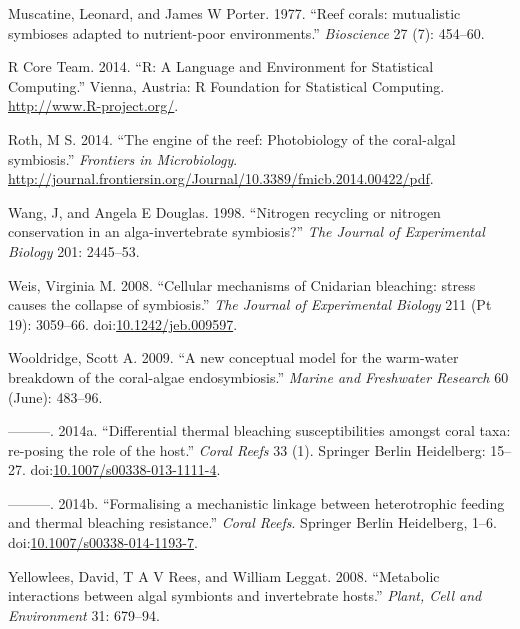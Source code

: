 \documentclass[]{elsarticle} %
\begin{document}
\hypertarget{ref-Muscatine:1977p4220}{}
Muscatine, Leonard, and James W Porter. 1977. ``Reef corals: mutualistic
symbioses adapted to nutrient-poor environments.'' \emph{Bioscience} 27
(7): 454--60.

\hypertarget{ref-RALanguageandEn:2014wf}{}
R Core Team. 2014. ``R: A Language and Environment for Statistical
Computing.'' Vienna, Austria: R Foundation for Statistical Computing.
\url{http://www.R-project.org/}.

\hypertarget{ref-Roth:2014wf}{}
Roth, M S. 2014. ``The engine of the reef: Photobiology of the
coral-algal symbiosis.'' \emph{Frontiers in Microbiology}.
\url{http://journal.frontiersin.org/Journal/10.3389/fmicb.2014.00422/pdf}.

\hypertarget{ref-Wang:1998p128}{}
Wang, J, and Angela E Douglas. 1998. ``Nitrogen recycling or nitrogen
conservation in an alga-invertebrate symbiosis?'' \emph{The Journal of
Experimental Biology} 201: 2445--53.

\hypertarget{ref-Weis:2008p944}{}
Weis, Virginia M. 2008. ``Cellular mechanisms of Cnidarian bleaching:
stress causes the collapse of symbiosis.'' \emph{The Journal of
Experimental Biology} 211 (Pt 19): 3059--66.
doi:\href{https://doi.org/10.1242/jeb.009597}{10.1242/jeb.009597}.

\hypertarget{ref-Wooldridge:2009p7807}{}
Wooldridge, Scott A. 2009. ``A new conceptual model for the warm-water
breakdown of the coral-algae endosymbiosis.'' \emph{Marine and
Freshwater Research} 60 (June): 483--96.

\hypertarget{ref-Wooldridge:2014di}{}
---------. 2014a. ``Differential thermal bleaching susceptibilities
amongst coral taxa: re-posing the role of the host.'' \emph{Coral Reefs}
33 (1). Springer Berlin Heidelberg: 15--27.
doi:\href{https://doi.org/10.1007/s00338-013-1111-4}{10.1007/s00338-013-1111-4}.

\hypertarget{ref-Wooldridge:2014hc}{}
---------. 2014b. ``Formalising a mechanistic linkage between
heterotrophic feeding and thermal bleaching resistance.'' \emph{Coral
Reefs}. Springer Berlin Heidelberg, 1--6.
doi:\href{https://doi.org/10.1007/s00338-014-1193-7}{10.1007/s00338-014-1193-7}.

\hypertarget{ref-Yellowlees:2008p331}{}
Yellowlees, David, T A V Rees, and William Leggat. 2008. ``Metabolic
interactions between algal symbionts and invertebrate hosts.''
\emph{Plant, Cell and Environment} 31: 679--94.
\end{document}
